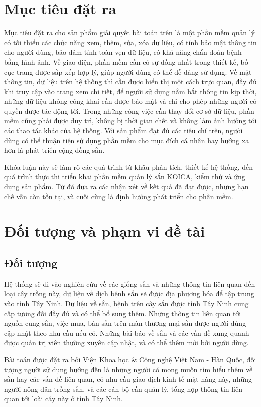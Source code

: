 \documentclass[./../main.tex]{subfiles}
\begin{document}
\section{Mục tiêu đặt ra}
Mục tiêu đặt ra cho sản phẩm giải quyết bài toán trên là một phần mềm quản lý có tối thiểu các chức năng xem, thêm, sửa, xóa dữ liệu, có tính bảo mật thông tin cho người dùng, bảo đảm tính toàn vẹn dữ liệu, có khả năng chẩn đoán bệnh bằng hình ảnh. Về giao diện, phần mềm cần có sự đồng nhất trong thiết kế, bố cục trang được sắp xếp hợp lý, giúp người dùng có thể dễ dàng sử dụng. Về mặt thông tin, dữ liệu trên hệ thống thì cần được hiển thị một cách trực quan, đầy đủ khi truy cập vào trang xem chi tiết, để người sử dụng nắm bắt thông tin kịp thời, những dữ liệu không công khai cần được bảo mật và chỉ cho phép những người có quyền được tác động tới. Trong những công việc cần thay đổi cơ sở dữ liệu, phần mềm cũng phải được duy trì, không bị thời gian chết và không làm ảnh hưởng tới các thao tác khác của hệ thống. Với sản phẩm đạt đủ các tiêu chí trên, người dùng có thể thuận tiện sử dụng phần mềm cho mục đích cá nhân hay hướng xa hơn là phát triển cộng đồng sắn.

Khóa luận này sẽ làm rõ các quá trình từ khâu phân tích, thiết kế hệ thống, đến quá trình thực thi triển khai phần mềm quản lý sắn KOICA, kiểm thử và ứng dụng sản phẩm. Từ đó đưa ra các nhận xét về kết quả đã đạt được, những hạn chế vẫn còn tồn tại, và cuối cùng là định hướng phát triển cho phần mềm.

\section{Đối tượng và phạm vi đề tài}
\subsection{Đối tượng}
Hệ thống sẽ đi vào nghiên cứu về các giống sắn và những thông tin liên quan đến loại cây trồng này, dữ liệu về dịch bệnh sắn sẽ được địa phương hóa để tập trung vào tỉnh Tây Ninh. Dữ liệu về sắn, bệnh trên cây sắn được tỉnh Tây Ninh cung cấp tương đối đầy đủ và có thể bổ sung thêm. Những thông tin liên quan tới nguồn cung sắn, việc mua, bán sắn trên màn thương mại sắn được người dùng cập nhật theo nhu cầu nếu có. Những bài báo về sắn và các vấn đề xung quanh được quản trị viên thường xuyên cập nhật, và có thể thêm mới bởi người dùng.

Bài toán được đặt ra bởi Viện Khoa học \& Công nghệ Việt Nam - Hàn Quốc, đối tượng người sử dụng hướng đến là những người có mong muốn tìm hiểu thêm về sắn hay các vấn đề liên quan, có nhu cầu giao dịch kinh tế mặt hàng này, những người nông dân trồng sắn, và các cán bộ cần quản lý, tổng hợp thông tin liên quan tới loài cây này ở tỉnh Tây Ninh.
\end{document}
